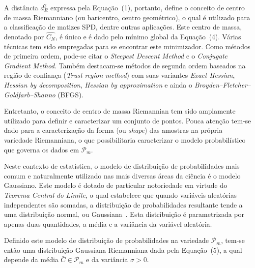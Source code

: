 \documentclass[a4paper,titlepage]{article}
\begin{document}
A distância $d^2_R$ expressa pela Equação~(1), portanto, define o conceito de
centro de massa Riemanniano (ou baricentro, centro geométrico), o qual é utilizado
para a classificação de matizes SPD, dentre outras aplicações. Este centro de
massa, denotado por $\hat{C_N}$, é único e é dado pelo mínimo global da
Equação~(4). Várias técnicas tem sido empregadas para se encontrar este
minimizador. Como métodos de primeira ordem, pode-se citar o \textit{Steepest
Descent Method} e o \textit{Conjugate Gradient Method}. Também destacam-se
métodos de segunda ordem baseados na região de confiança (\textit{Trust region
method}) com suas variantes \textit{Exact Hessian}, \textit{Hessian by
decomposition}, \textit{Hessian by approximation} e ainda o
\textit{Broyden–Fletcher–Goldfarb–Shanno} (BFGS).

Entretanto, o conceito de centro de massa Riemannian tem sido amplamente
utilizado para definir e caracterizar um conjunto de pontos. Pouca atenção
tem-se dado para a caracterização da forma (ou \textit{shape}) das amostras na
própria variedade Riemanniana, o que possibilitaria caracterizar o modelo
probabilístico que governa os dados em $\mathcal{P}_m$.

Neste contexto de estatística, o modelo de distribuição de probabilidades
mais comum e naturalmente utilizado nas mais diversas áreas da ciência é o
modelo Gaussiano. Este modelo é dotado de particular notoriedade em virtude do
\textit{Teorema Central do Limite}, o qual estabelece que quando variáveis
aleatórias independentes são somadas, a distribuição de probabilidades
resultante tende a uma distribuição normal, ou
Gaussiana~\cite{fischer2010history}. Esta distribuição é parametrizada por
apenas duas quantidades, a média e a variância da variável aleatória.

Definido este modelo de distribuição de probabilidades na variedade
$\mathcal{P}_m$, tem-se então uma distribuição Gaussiana Riemanniana dada pela
Equação~(5), a qual depende da média $\bar{C} \in \mathcal{P}_m$ e da variância
$\sigma > 0$.
\end{document}
